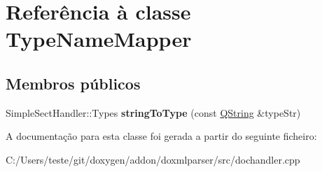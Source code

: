 \hypertarget{class_type_name_mapper}{\section{Referência à classe Type\-Name\-Mapper}
\label{class_type_name_mapper}
}
\subsection*{Membros públicos}
\begin{DoxyCompactItemize}
\item 
\hypertarget{class_type_name_mapper_ad5dbdea32270511ee1cc5ac54ccbbdf0}{Simple\-Sect\-Handler\-::\-Types {\bfseries string\-To\-Type} (const \hyperlink{class_q_string}{Q\-String} \&type\-Str)}\label{class_type_name_mapper_ad5dbdea32270511ee1cc5ac54ccbbdf0}

\end{DoxyCompactItemize}


A documentação para esta classe foi gerada a partir do seguinte ficheiro\-:\begin{DoxyCompactItemize}
\item 
C\-:/\-Users/teste/git/doxygen/addon/doxmlparser/src/dochandler.\-cpp\end{DoxyCompactItemize}

